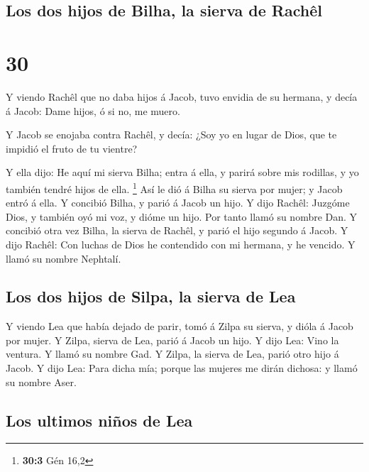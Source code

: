 \hypertarget{los-dos-hijos-de-bilha-la-sierva-de-rachuxeal}{%
\subsection{Los dos hijos de Bilha, la sierva de
Rachêl}\label{los-dos-hijos-de-bilha-la-sierva-de-rachuxeal}}

\hypertarget{section-29}{%
\section{30}\label{section-29}}

 Y viendo Rachêl que no daba hijos á Jacob, tuvo envidia
de su hermana, y decía á Jacob: Dame hijos, ó si no, me muero.

 Y Jacob se enojaba contra Rachêl, y decía: ¿Soy yo en
lugar de Dios, que te impidió el fruto de tu vientre?

 Y ella dijo: He aquí mi sierva Bilha; entra á ella, y
parirá sobre mis rodillas, y yo también tendré hijos de ella.
\footnote{\textbf{30:3} Gén 16,2}  Así le dió á Bilha su
sierva por mujer; y Jacob entró á ella.  Y concibió Bilha,
y parió á Jacob un hijo.  Y dijo Rachêl: Juzgóme Dios, y
también oyó mi voz, y dióme un hijo. Por tanto llamó su nombre Dan.
 Y concibió otra vez Bilha, la sierva de Rachêl, y parió
el hijo segundo á Jacob.  Y dijo Rachêl: Con luchas de
Dios he contendido con mi hermana, y he vencido. Y llamó su nombre
Nephtalí.

\hypertarget{los-dos-hijos-de-silpa-la-sierva-de-lea}{%
\subsection{Los dos hijos de Silpa, la sierva de
Lea}\label{los-dos-hijos-de-silpa-la-sierva-de-lea}}

 Y viendo Lea que había dejado de parir, tomó á Zilpa su
sierva, y dióla á Jacob por mujer.  Y Zilpa, sierva de
Lea, parió á Jacob un hijo.  Y dijo Lea: Vino la ventura.
Y llamó su nombre Gad.  Y Zilpa, la sierva de Lea, parió
otro hijo á Jacob.  Y dijo Lea: Para dicha mía; porque
las mujeres me dirán dichosa: y llamó su nombre Aser.

\hypertarget{los-ultimos-niuxf1os-de-lea}{%
\subsection{Los ultimos niños de
Lea}\label{los-ultimos-niuxf1os-de-lea}}

